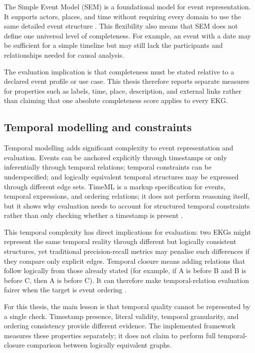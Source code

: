 The Simple Event Model (SEM) is a foundational model for event representation. It supports actors, places, and time without requiring every domain to use the same detailed event structure \citep{sem2011}. This flexibility also means that SEM does not define one universal level of completeness. For example, an event with a date may be sufficient for a simple timeline but may still lack the participants and relationships needed for causal analysis.

The evaluation implication is that completeness must be stated relative to a declared event profile or use case. This thesis therefore reports separate measures for properties such as labels, time, place, description, and external links rather than claiming that one absolute completeness score applies to every EKG.

\subsection{Temporal modelling and constraints}

Temporal modelling adds significant complexity to event representation and evaluation. Events can be anchored explicitly through timestamps or only inferentially through temporal relations; temporal constraints can be underspecified; and logically equivalent temporal structures may be expressed through different edge sets. TimeML is a markup specification for events, temporal expressions, and ordering relations; it does not perform reasoning itself, but it shows why evaluation needs to account for structured temporal constraints rather than only checking whether a timestamp is present \citep{timeml2003}.

This temporal complexity has direct implications for evaluation: two EKGs might represent the same temporal reality through different but logically consistent structures, yet traditional precision-recall metrics may penalise such differences if they compare only explicit edges. Temporal closure means adding relations that follow logically from those already stated (for example, if A is before B and B is before C, then A is before C). It can therefore make temporal-relation evaluation fairer when the target is event ordering \citep{tempeval2011}.

For this thesis, the main lesson is that temporal quality cannot be represented by a single check. Timestamp presence, literal validity, temporal granularity, and ordering consistency provide different evidence. The implemented framework measures these properties separately; it does not claim to perform full temporal-closure comparison between logically equivalent graphs.

